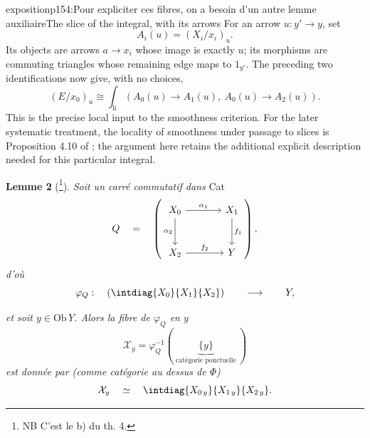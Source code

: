 \begin{dcomment}{exposition}{p154:Pour expliciter ces fibres, on a besoin d'un autre lemme auxiliaire}{The slice of the integral, with its arrows}
For an arrow $u:y'\to y$, set
\[
 A_i(u)=(X_i/x_i)_u.
\]
Its objects are arrows $a\to x_i$ whose image is exactly $u$; its morphisms are commuting triangles whose remaining edge maps to $1_{y'}$. The preceding two identifications now give, with no choices,
\[
       (E/x_0)_u\cong\int_{\mathrm{li}}
          (A_0(u)\longrightarrow A_1(u),\ A_0(u)\longrightarrow A_2(u)).
\]
This is the precise local input to the smoothness criterion. For the later systematic treatment, the locality of smoothness under passage to slices is Proposition 4.10 of \citet{Maltsiniotis2005Asphericite}; the argument here retains the additional explicit description needed for this particular integral.
\end{dcomment}


\noindent\textbf{Lemme 2} (\footnote[106]{NB C'est le b) du th. 4.}). \textit{Soit un carré commutatif dans} Cat
\[
Q \quad = \quad
\left(
\begin{tikzcd}[row sep=large,column sep=large]
X_0 \arrow[r, "\alpha_1"] \arrow[d, "\alpha_2"'] & X_1 \arrow[d, "f_1"] \\
X_2 \arrow[r, "f_2"] & Y
\end{tikzcd}
\right),
\]
\textit{d'où}
\[
\varphi_Q : \quad \left( \intdiag{X_0}{X_1}{X_2} \right) \qquad\longrightarrow\qquad Y,
\]

\textit{et soit $y\in\mathrm{Ob}\,Y$. Alors la fibre de $\varphi_Q$ en $y$}
\[
\mathcal{X}_y = \varphi_Q^{-1}(\ \underbrace{\{y\}}_{\text{catégorie ponctuelle}}\ )
\]
\textit{est donnée par (comme catégorie au dessus de $\Phi$)}
\[
\mathcal{X}_y \quad\simeq\quad \intdiag{X_{0\,y}}{X_{1\,y}}{X_{2\,y}} .
\]

